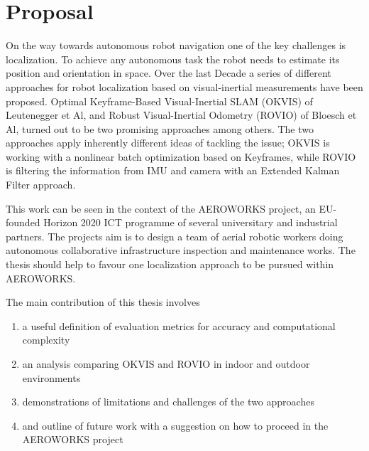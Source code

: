 \chapter{Proposal}
\label{sec:Proposal}

On the way towards autonomous robot navigation one of the key challenges is localization. To achieve any autonomous task the robot needs to estimate its position and orientation in space. Over the last Decade a series of different approaches for robot localization based on visual-inertial measurements have been proposed. Optimal Keyframe-Based Visual-Inertial SLAM (OKVIS) of Leutenegger et Al, \cite{leutenegger2013keyframe} \cite{leutenegger2015keyframe} and Robust Visual-Inertial Odometry (ROVIO) of Bloesch et Al, \cite{bloeschrobust} turned out to be two promising approaches among others. The two approaches apply inherently different ideas of tackling the issue; OKVIS is working with a nonlinear batch optimization based on Keyframes, while ROVIO is filtering the information from IMU and camera with an Extended Kalman Filter approach.

This work can be seen in the context of the AEROWORKS project, an EU-founded Horizon 2020 ICT programme of several universitary and industrial partners. The projects aim is to design a team of aerial robotic workers doing autonomous collaborative infrastructure inspection and maintenance works. The thesis should help to favour one localization approach to be pursued within AEROWORKS.

The main contribution of this thesis involves

\begin{enumerate}
\item a useful definition of evaluation metrics for accuracy and computational complexity
\item an analysis comparing OKVIS and ROVIO in indoor and outdoor environments
\item demonstrations of limitations and challenges of the two approaches
\item and outline of future work with a suggestion on how to proceed in the AEROWORKS project
\end{enumerate}